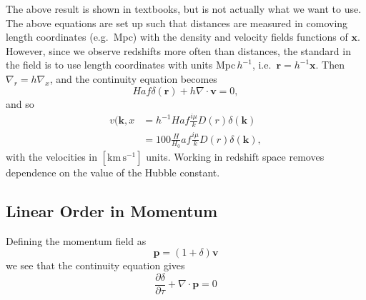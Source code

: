 \documentclass[11pt, oneside]{article}   	%
\begin{document}
The above  result is shown in textbooks, but is not actually what
we want to use.
The above equations  are set up such that distances are measured in
comoving length coordinates (e.g.\ Mpc) with the density and velocity fields functions of $\mathbf{x}$.
However, since we observe redshifts more often than distances,
the standard in the field is to use length coordinates with units Mpc\,$h^{-1}$, i.e.\ $\mathbf{r} = h^{-1}\mathbf{x}$.
Then $\nabla_r = h \nabla_x$,
and the continuity equation becomes
\begin{equation}
Haf\delta(\mathbf{r}) + h \nabla \cdot \mathbf{v}=0,
\label{rv_h:eqn}
\end{equation}
and so
\begin{align}
v(\mathbf{k},x 
&=  h^{-1} Haf\frac{i\mu}{k} D(r) \delta(\mathbf{k})\\
&=  100  \frac{H}{H_0}af \frac{i\mu}{k} D(r) \delta(\mathbf{k}),
\label{dvfourier_Mpchinv:eqn}
\end{align}
with the velocities in $[\text{km}\,\text{s}^{-1}]$ units.
Working in redshift space removes dependence on the value of the Hubble constant.

\begin{comment}
However we take the convention of expressing distances in terms of redshift  with the density and velocity fields functions of $\mathbf{r}$.
Since $\nabla_x = H_0 \nabla_r$,
\begin{equation}
Haf\delta(\mathbf{k})  + H_0 \mathbf{k} \cdot \mathbf{v}(\mathbf{k})=0,
\end{equation}
which has the solution
\begin{equation}
 \mathbf{v}(\mathbf{k},r) = \frac{H}{H_0}af \frac{i\mathbf{k}}{k^2} \delta(\mathbf{k},r).
\end{equation}
The Fourier transform of the projected radial velocity is then
\begin{align}
v(\mathbf{k},r) & = \frac{H}{H_0}af \frac{i\mu}{k} \delta(\mathbf{k},r)\\
&=  \frac{H}{H_0}af \frac{i\mu}{k} D(r) \delta(\mathbf{k}),
\label{dvfourier:eqn}
\end{align}
\end{comment}

\subsection{Linear Order in Momentum}
Defining the momentum field as
\begin{equation}
\mathbf{p} = (1+\delta)\mathbf{v}
\end{equation}
we see that the continuity equation gives 
\begin{equation}
\frac{\partial \delta}{\partial \tau} + \nabla \cdot \mathbf{p}=0
\end{equation}
\end{document}

